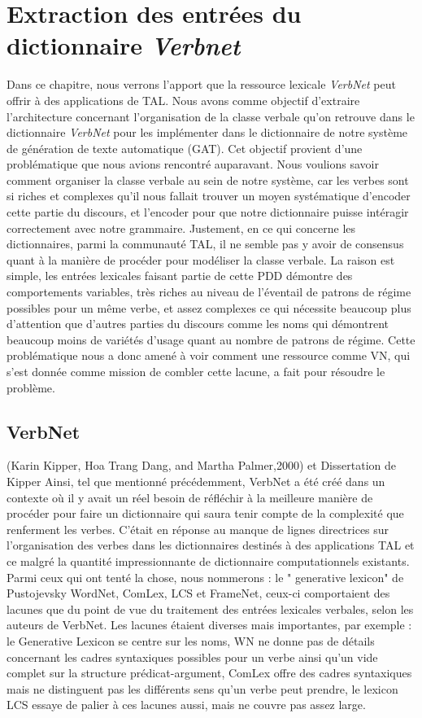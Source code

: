\chapter{Extraction des entrées du dictionnaire \emph{Verbnet}}

Dans ce chapitre, nous verrons l'apport que la ressource lexicale \emph{VerbNet} peut offrir à des applications de TAL. Nous avons comme objectif d'extraire l'architecture concernant l'organisation de la classe verbale qu'on retrouve dans le dictionnaire \emph{VerbNet} pour les implémenter dans le dictionnaire de notre système de génération de texte automatique (GAT). Cet objectif provient d'une problématique que nous avions rencontré auparavant. Nous voulions savoir comment organiser la classe verbale au sein de notre système, car les verbes sont si riches et complexes qu'il nous fallait trouver un moyen systématique d'encoder cette partie du discours, et l'encoder pour que notre dictionnaire puisse intéragir correctement avec notre grammaire.  Justement, en ce qui concerne les dictionnaires, parmi la communauté TAL,  il ne semble pas y avoir de consensus quant à la manière de procéder pour modéliser la classe verbale. La raison est simple,  les entrées lexicales faisant partie de cette PDD démontre des comportements variables, très riches au niveau de l'éventail de patrons de régime possibles pour un même verbe, et assez complexes ce qui nécessite beaucoup plus d'attention que d'autres parties du discours comme les noms qui démontrent beaucoup moins de variétés d'usage quant au nombre de patrons de régime. Cette problématique nous a donc amené à voir comment une ressource comme VN, qui s'est donnée comme mission de combler cette lacune,  a fait pour résoudre le problème.

\section{VerbNet}
(Karin Kipper, Hoa Trang Dang, and Martha Palmer,2000) et Dissertation de Kipper
Ainsi, tel que mentionné précédemment, VerbNet a été créé dans un contexte où il y avait un réel besoin de réfléchir à la meilleure manière de procéder pour faire un dictionnaire qui saura tenir compte de la complexité que renferment les verbes. C'était en réponse au manque de lignes directrices sur l'organisation des verbes dans les dictionnaires destinés à des applications TAL et ce malgré la quantité impressionnante de dictionnaire computationnels existants.  Parmi ceux qui ont tenté la chose, nous nommerons : le " generative lexicon" de Pustojevsky WordNet, ComLex, LCS et FrameNet, ceux-ci comportaient des lacunes que du point de vue du traitement des entrées lexicales verbales, selon les auteurs de VerbNet. Les lacunes étaient diverses mais importantes, par exemple : le Generative Lexicon se centre sur les noms, WN ne donne pas de détails concernant les cadres syntaxiques possibles pour un verbe ainsi qu'un vide complet sur la structure prédicat-argument, ComLex offre des cadres syntaxiques mais ne distinguent pas les différents sens qu'un verbe peut prendre, le lexicon LCS essaye de palier à ces lacunes aussi, mais ne couvre pas assez large.

